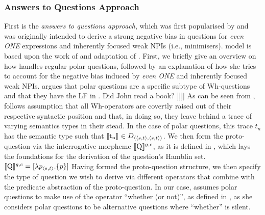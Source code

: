 \subsubsection{Answers to Questions Approach}
First is the \textit{answers to questions approach}, which was first popularised by \textcite{Guerzoni2003,Guerzoni2004} and was originally intended to derive a strong negative bias in questions for \textit{even \MakeUppercase{one}} expressions and inherently focused weak NPIs (i.e., minimisers).  model is based upon the work of \textcite{Hamblin1973} and  adaptation of \textcite{Karttunen1977}. First, we briefly give an overview on how \textcite{Guerzoni2003,Guerzoni2004} handles regular polar questions, followed by an explanation of how she tries to account for the negative bias induced by \textit{even \MakeUppercase{one}} and inherently focused weak NPIs. \textcite{Guerzoni2003,Guerzoni2004} argues that polar questions are a specific subtype of Wh-questions and that they have the LF in .
\pex
\a Did John read a book?
\a[] [ whether-(or-not) [ 1 [ Q [ t\textsubscript{1} [ John read a book ]\hspace{0.5mm}]\hspace{0.5mm}]\hspace{0.5mm}]\hspace{0.5mm}]
\xe
As can be seen from , \textcite{Guerzoni2003,Guerzoni2004} follows  assumption that all Wh-operators are covertly raised out of their respective syntactic position and that, in doing so, they leave behind a trace of varying semantics types in their stead. In the case of polar questions, this trace $t_n$ has the semantic type such that $\intension[]{t\textsubscript{n}}\in D_{\langle\langle s,t\rangle,\langle s,t\rangle\rangle}$. We then form the proto-question via the interrogative morpheme $\intension[g,c]{Q}$, as it is defined in , which lays the foundations for the derivation of the question's Hamblin set.
\ex
$\intension[g,c]{Q}=[\lambda{p}_{\langle s,t\rangle}.\{p\}]$
\xe
Having formed the proto-question structure, we then specify the type of question we wish to derive via different operators that combine with the predicate abstraction of the proto-question. In our case, \textcite{Guerzoni2003,Guerzoni2004} assumes polar questions to make use of the operator \enquote{whether (or not)}, as defined in , as she considers polar questions to be alternative questions where \enquote{whether} is silent.
